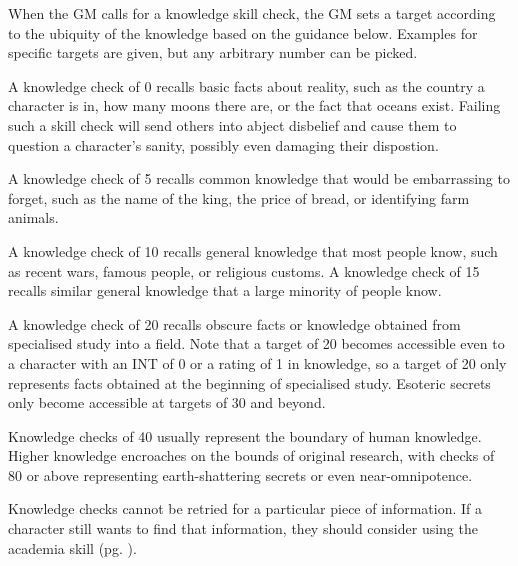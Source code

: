 When the GM calls for a knowledge skill check, the GM sets a target according
to the ubiquity of the knowledge based on the guidance below. Examples
for specific targets are given, but any arbitrary number can be picked.

A knowledge check of 0 recalls basic facts about reality, such as the country
a character is in, how many moons there are, or the fact that oceans exist.
Failing such a skill check will send others into abject disbelief and cause
them to question a character's sanity, possibly even damaging their dispostion.

A knowledge check of 5 recalls common knowledge that would be embarrassing to
forget, such as the name of the king, the price of bread, or identifying farm
animals.

A knowledge check of 10 recalls general knowledge that most people know, such
as recent wars, famous people, or religious customs. A knowledge check of 15
recalls similar general knowledge that a large minority of people know.

A knowledge check of 20 recalls obscure facts or knowledge obtained
from specialised study into a field. Note that a target of 20 becomes
accessible even to a character with an INT of 0 or a rating of 1 in knowledge, so
a target of 20 only represents facts obtained at the beginning of specialised
study. Esoteric secrets only become accessible at targets of 30 and beyond.

Knowledge checks of 40 usually represent the boundary of human knowledge.
Higher knowledge encroaches on the bounds of original research, with checks
of 80 or above representing earth-shattering secrets or even near-omnipotence.

Knowledge checks cannot be retried for a particular piece of information. If
a character still wants to find that information, they should consider using
the academia skill (pg. \pageref{academia}).

